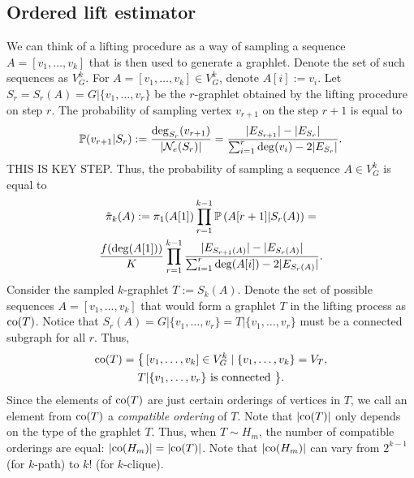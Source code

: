 	\subsection{Ordered lift estimator}
	
	We can think of a lifting procedure as a way of sampling a sequence $A = [v_1, \ldots, v_k]$ that is then used to generate a graphlet.
	Denote the set of such sequences as $V^k_G$.
	For $A = [v_1, \ldots, v_k] \in V^k_G$, denote $A[i]:=v_i$.
	Let $S_r = S_r(A) = G|\{v_1,\ldots, v_r\}$ be the $r$-graphlet obtained by the lifting procedure on step $r$.
	The probability of sampling vertex $v_{r+1}$ on the step $r+1$ is equal to
	\begin{equation*}
	    \mathbb{P}(v_{r+1}|S_{r}) := \frac{\mathrm{deg}_{S_r}(v_{r+1})}{|\mathcal{N}_e(S_r)|} =
	    \frac{|E_{S_{r+1}}| - |E_{S_r}|}{\sum_{i=1}^r \mathrm{deg}(v_i) - 2|E_{S_r}|}.
	\end{equation*}
	THIS IS KEY STEP.
	Thus, the probability of sampling a sequence $A \in V^k_G$ is equal to
	\begin{multline}
	\label{eq:tildepi}
	    \Tilde\pi_k(A) := \pi_1(A[1])\prod_{r=1}^{k-1} \P\left(A[r+1]|S_r(A)\right) =\\
	    \frac{f(\deg(A[1]))}{K} \prod_{r=1}^{k-1} \frac{|E_{S_{r+1}(A)}| - |E_{S_r(A)}|}{\sum_{i=1}^r \deg(A[i]) - 2|E_{S_r(A)}|}.
	\end{multline}
	Consider the sampled $k$-graphlet $T := S_k(A)$.
	Denote the set of possible sequences $A = [v_1,\ldots, v_k]$ that would form a graphlet $T$ in the lifting process as $\mathrm{co}(T)$.
	Notice that $S_r(A) = G|\{v_1,\ldots,v_r\} = T|\{v_1,\ldots,v_r\}$ must be a connected subgraph for all $r$.
	Thus,
	\begin{multline*}
	\label{eq:co}
	    \co(T) = \big\{\,[v_1,\ldots,v_k]\in V^k_G \mid \{v_1,\ldots,v_k\} = V_T,\\  T|\{v_1,\ldots,v_r\} \text{ is connected }\big\}.
	\end{multline*}
	Since the elements of $\mathrm{co}(T)$ are just certain orderings of vertices in $T$, we call an element from $\mathrm{co}(T)$ a \textit{compatible ordering} of $T$.
	Note that $|\mathrm{co}(T)|$ only depends on the type of the graphlet $T$.
	Thus, when $T\sim H_m$, the number of compatible orderings are equal: $|\mathrm{co}(H_m)| = |\mathrm{co}(T)|$. Note that $|\mathrm{co}(H_m)|$ can vary from $2^{k-1}$ (for $k$-path) to $k!$ (for $k$-clique).
	
